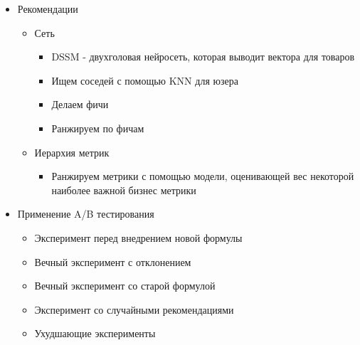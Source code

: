 \documentclass[a4paper, 12pt]{article}
\begin{document}
\begin{itemize}
\item
  
  Рекомендации
  

  \begin{itemize}
  \item
    
    Сеть
    

    \begin{itemize}
    \item
      
      DSSM - двухголовая нейросеть, которая выводит вектора для товаров
      
    \item
      
      Ищем соседей с помощью KNN для юзера
      
    \item
      
      Делаем фичи
      
    \item
      
      Ранжируем по фичам
      
    \end{itemize}
  \item
    
    Иерархия метрик
    

    \begin{itemize}
    \item
      
      Ранжируем метрики с помощью модели, оценивающей вес некоторой
      наиболее важной бизнес метрики
      
    \end{itemize}
  \end{itemize}
\item
  
  Применение A/B тестирования
  

  \begin{itemize}
  \item
    
    Эксперимент перед внедрением новой формулы
    
  \item
    
    Вечный эксперимент с отклонением
    
  \item
    
    Вечный эксперимент со старой формулой
    
  \item
    
    Эксперимент со случайными рекомендациями
    
  \item
    
    Ухудшающие эксперименты
    
  \end{itemize}
\end{itemize}
\end{document}
